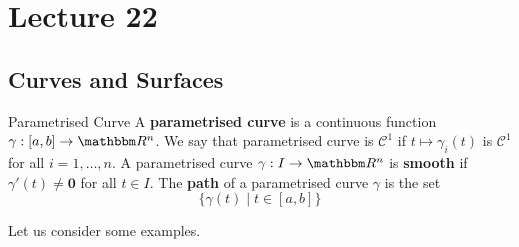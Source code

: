 \documentclass[Analysis-3]{subfiles}
\begin{document}
\chapter*{Lecture 22} %
\setcounter{chapter}{22} %
\setcounter{section}{0}

\section{Curves and Surfaces}

\begin{Def}{Parametrised Curve}{} 
    A \textbf{parametrised curve} is a continuous function $\gamma : [a,b] \to \R^n$. We say that parametrised curve is $\mathscr{C}^1$ if $t \mapsto \gamma_i(t)$ is $\mathscr{C}^1$ for all $i = 1,\dots,n$. A parametrised curve $\gamma : I \to \R^n$ is \textbf{smooth} if $\gamma'(t) \neq \mathbf{0}$ for all $t \in I$. The \textbf{path} of a parametrised curve $\gamma$ is the set 
    \[
        \{ \gamma(t) \mid t \in [a,b] \}    
    \] 
\end{Def}

Let us consider some examples. 
\end{document}
